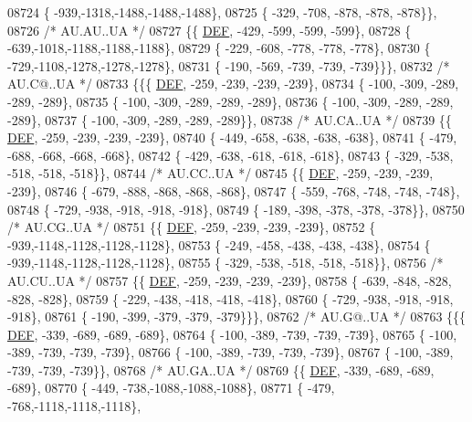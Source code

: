 \begin{DoxyCode}
08724 \{ -939,-1318,-1488,-1488,-1488\},
08725 \{ -329, -708, -878, -878, -878\}\},
08726 \textcolor{comment}{/* AU.AU..UA */}
08727 \{\{  \mbox{\hyperlink{1_88_84__epars_8h_a397419fc12b37ed479c8abb9d444d843}{DEF}}, -429, -599, -599, -599\},
08728 \{ -639,-1018,-1188,-1188,-1188\},
08729 \{ -229, -608, -778, -778, -778\},
08730 \{ -729,-1108,-1278,-1278,-1278\},
08731 \{ -190, -569, -739, -739, -739\}\}\},
08732 \textcolor{comment}{/* AU.C@..UA */}
08733 \{\{\{  \mbox{\hyperlink{1_88_84__epars_8h_a397419fc12b37ed479c8abb9d444d843}{DEF}}, -259, -239, -239, -239\},
08734 \{ -100, -309, -289, -289, -289\},
08735 \{ -100, -309, -289, -289, -289\},
08736 \{ -100, -309, -289, -289, -289\},
08737 \{ -100, -309, -289, -289, -289\}\},
08738 \textcolor{comment}{/* AU.CA..UA */}
08739 \{\{  \mbox{\hyperlink{1_88_84__epars_8h_a397419fc12b37ed479c8abb9d444d843}{DEF}}, -259, -239, -239, -239\},
08740 \{ -449, -658, -638, -638, -638\},
08741 \{ -479, -688, -668, -668, -668\},
08742 \{ -429, -638, -618, -618, -618\},
08743 \{ -329, -538, -518, -518, -518\}\},
08744 \textcolor{comment}{/* AU.CC..UA */}
08745 \{\{  \mbox{\hyperlink{1_88_84__epars_8h_a397419fc12b37ed479c8abb9d444d843}{DEF}}, -259, -239, -239, -239\},
08746 \{ -679, -888, -868, -868, -868\},
08747 \{ -559, -768, -748, -748, -748\},
08748 \{ -729, -938, -918, -918, -918\},
08749 \{ -189, -398, -378, -378, -378\}\},
08750 \textcolor{comment}{/* AU.CG..UA */}
08751 \{\{  \mbox{\hyperlink{1_88_84__epars_8h_a397419fc12b37ed479c8abb9d444d843}{DEF}}, -259, -239, -239, -239\},
08752 \{ -939,-1148,-1128,-1128,-1128\},
08753 \{ -249, -458, -438, -438, -438\},
08754 \{ -939,-1148,-1128,-1128,-1128\},
08755 \{ -329, -538, -518, -518, -518\}\},
08756 \textcolor{comment}{/* AU.CU..UA */}
08757 \{\{  \mbox{\hyperlink{1_88_84__epars_8h_a397419fc12b37ed479c8abb9d444d843}{DEF}}, -259, -239, -239, -239\},
08758 \{ -639, -848, -828, -828, -828\},
08759 \{ -229, -438, -418, -418, -418\},
08760 \{ -729, -938, -918, -918, -918\},
08761 \{ -190, -399, -379, -379, -379\}\}\},
08762 \textcolor{comment}{/* AU.G@..UA */}
08763 \{\{\{  \mbox{\hyperlink{1_88_84__epars_8h_a397419fc12b37ed479c8abb9d444d843}{DEF}}, -339, -689, -689, -689\},
08764 \{ -100, -389, -739, -739, -739\},
08765 \{ -100, -389, -739, -739, -739\},
08766 \{ -100, -389, -739, -739, -739\},
08767 \{ -100, -389, -739, -739, -739\}\},
08768 \textcolor{comment}{/* AU.GA..UA */}
08769 \{\{  \mbox{\hyperlink{1_88_84__epars_8h_a397419fc12b37ed479c8abb9d444d843}{DEF}}, -339, -689, -689, -689\},
08770 \{ -449, -738,-1088,-1088,-1088\},
08771 \{ -479, -768,-1118,-1118,-1118\},

\end{DoxyCode}
